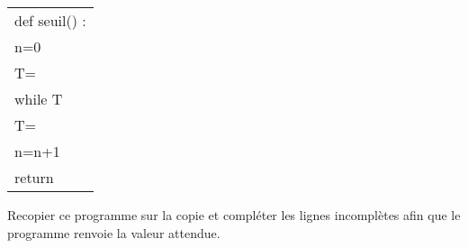 \begin{enumerate}
\begin{enumerate}
\begin{minipage}[]{5cm}
\begin{tabular}[]{|p{4.5cm}|}
\hline
def seuil() :\\
\hspace{1.2em}n=0\\
\hspace{1.2em}T= \dotfill\\
\hspace{1.2em}while T\dotfill\\
\hspace{4em}T= \dotfill\\
\hspace{4em}n=n+1\\
\hspace{1.2em}return\\
\hline
\end{tabular}
\end{minipage}
\hspace{1.5cm}
\begin{minipage}[]{5.6cm}
Recopier ce programme sur la copie
et compléter les lignes incomplètes
afin que le programme renvoie la valeur attendue.
\end{minipage}
\end{enumerate}
\end{enumerate}


 \vspace{0.5cm}
 

